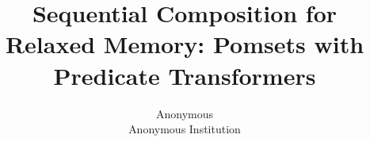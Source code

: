 \documentclass[conference,compsoc]{IEEEtran}
\author{Anonymous\\Anonymous Institution}
\title{Sequential Composition for Relaxed Memory: Pomsets with Predicate Transformers}
\theoremstyle{plain}
\theoremstyle{definition}
\theoremstyle{remark}
\begin{document}
 
\pagestyle{plain}
\maketitle
\begin{abstract}\end{abstract}





%


%



%
\end{document}
